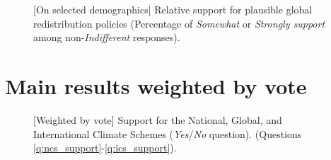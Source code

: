 \begin{figure}[h!]
    \caption[{[}On selected demographics{]} Relative support for plausible global policies]{[On selected demographics] Relative support for plausible global redistribution policies (Percentage of \textit{Somewhat} or \textit{Strongly support} among non-\textit{Indifferent} responses). %
    }\label{fig:solidarity_support_pol_share}
\end{figure}

\clearpage
\section{Main results weighted by vote}\label{app:vote}
\begin{figure}[h!]
    \caption[{[}Weighted by vote{]} Support for the NCS, GCS, ICS]{[Weighted by vote] Support for the National, Global, and International Climate Schemes (\textit{Yes}/\textit{No} question). \hfill (Questions \ref{q:ncs_support}-\ref{q:ics_support}).
    }\label{fig:ics_weight_vote}
\end{figure}

